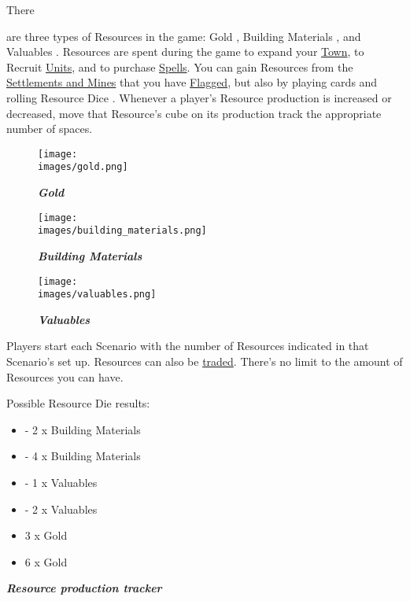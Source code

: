 \hypertarget{Resources}{There} are three types of Resources in the game: Gold , Building Materials , and Valuables .
Resources are spent during the game to expand your \hyperlink{Town}{Town}, to Recruit \hyperlink{Units}{Units}, and to purchase \hyperlink{spells}{Spells}.
You can gain Resources from the \hyperlink{Mines}{Settlements and Mines} that you have \hyperlink{Categories}{Flagged}, but also by playing cards and rolling Resource Dice .
Whenever a player's Resource production is increased or decreased, move that Resource's cube on its production track the appropriate number of spaces.\par
\begin{figure}[h]
  \centering
    \centering
    \texttt{[image: \\images/gold.png]}
    \caption{{\textit{\textbf{\textcolor{darkcandyapplered}{Gold}}}}}
  \endminipage
    \centering
    \texttt{[image: \\images/building\_materials.png]}
    \caption{{\textit{\textbf{{\textcolor{darkcandyapplered}{Building Materials}}}}}}
  \endminipage
    \centering
    \texttt{[image: \\images/valuables.png]}
    \caption{{\textit{\textbf{{\textcolor{darkcandyapplered}{Valuables}}}}}}
  \endminipage
\end{figure}
Players start each Scenario with the number of Resources indicated in that Scenario’s set up.
Resources can also be \hyperlink{Trading}{traded}.
There's no limit to the amount of Resources you can have.\bigbreak

\begin{minipage}[T]{0.38\textwidth}
    Possible Resource Die  results:\bigbreak
    \begin{itemize}
        \setlength\itemsep{10pt}
        \item  - 2 x Building Materials
        \item  - 4 x Building Materials
        \item  - 1 x Valuables
        \item  - 2 x Valuables
        \item  3 x Gold
        \item  6 x Gold
    \end{itemize}
\end{minipage}
\begin{minipage}[t]{0.48\textwidth}
    \break
    \centering
    \footnotesize{\textbf{\textit{\textcolor{darkcandyapplered}{Resource production tracker}}}}
\end{minipage}\hfill
